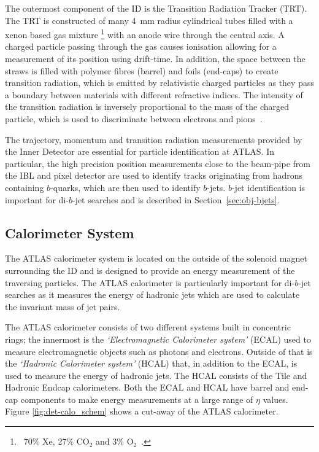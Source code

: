 The outermost component of the ID is the Transition Radiation Tracker (TRT).
The TRT is constructed of many \SI{4}{\mm} radius cylindrical tubes filled with a xenon based gas mixture
\footnote{\ 70\% Xe, 27\% $\text{CO}_2$ and 3\% $\text{O}_2$~\cite{det-ID_xe}.}
with an anode wire through the central axis.
A charged particle passing through the gas causes ionisation allowing for a measurement of its position using drift-time.
In addition, the space between the straws is filled with polymer fibres (barrel) and foils (end-caps) to create transition radiation,
which is emitted by relativistic charged particles as they pass a boundary between materials with different refractive indices.
The intensity of the transition radiation is inversely proportional to the mass of the charged particle,
which is used to discriminate between electrons and pions~\cite{det-ID_TR}.

The trajectory, momentum and transition radiation measurements provided by the Inner Detector are essential for particle identification at ATLAS.
In particular, the high precision position measurements close to the beam-pipe from the IBL and pixel detector
are used to identify tracks originating from hadrons containing $b$-quarks, which are then used to identify $b$-jets.
$b$-jet identification is important for di-$b$-jet searches and is described in Section~\ref{sec:obj-bjets}.

\subsection{Calorimeter System}
\label{sec:det-calo}

The ATLAS calorimeter system is located on the outside of the solenoid magnet surrounding the ID and
is designed to provide an energy measurement of the traversing particles.
The ATLAS calorimeter is particularly important for di-$b$-jet searches as it measures the
energy of hadronic jets which are used to calculate the invariant mass of jet pairs. %

The ATLAS calorimeter consists of two different systems built in concentric rings;
the innermost is the \textit{`Electromagnetic Calorimeter system'} (ECAL) used to measure electromagnetic objects such as photons and electrons.
Outside of that is the \textit{`Hadronic Calorimeter system'} (HCAL) that, in addition to the ECAL, is used to measure the energy of hadronic jets.
The HCAL consists of the Tile and Hadronic Endcap calorimeters.
Both the ECAL and HCAL have barrel and end-cap components to make energy measurements at a large range of $\eta$ values.
Figure \ref{fig:det-calo_schem} shows a cut-away of the ATLAS calorimeter.

